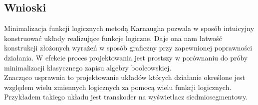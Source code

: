 \documentclass{article}
\begin{document}
        \subsection{Wnioski}
            Minimalizacja funkcji logicznych metodą Karnaugha pozwala  w sposób intuicyjny konstruować układy realizujące funkcje logiczne. Daje ona nam łatwość konstrukcji złożonych wyrażeń w sposób graficzny przy zapewnionej poprawności działania. W efekcie proces projektowania jest prostszy w porównaniu do próby minimalizacji klasycznego zapisu algebry booleowskiej.\\
            Znacząco usprawnia to projektowanie układów których działanie określone jest względem wielu zmiennych logicznych za pomocą wielu funkcji logicznych. Przykładem takiego układu jest transkoder na wyświetlacz siedmiosegmentowy.\\
\end{document}

